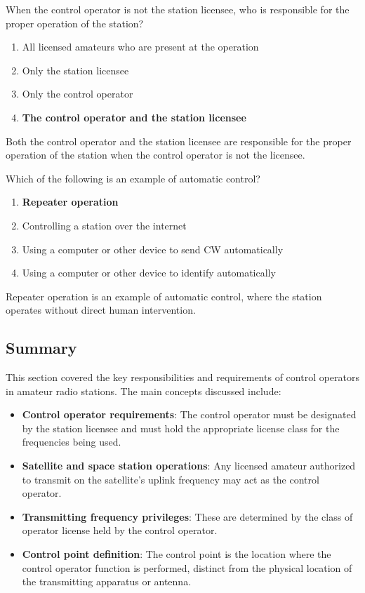
\begin{tcolorbox}[colback=gray!10!white,colframe=black!75!black,title={T1E07}]
When the control operator is not the station licensee, who is responsible for the proper operation of the station?
\begin{enumerate}[label=\Alph*,noitemsep]
    \item All licensed amateurs who are present at the operation
    \item Only the station licensee
    \item Only the control operator
    \item \textbf{The control operator and the station licensee}
\end{enumerate}
\end{tcolorbox}
Both the control operator and the station licensee are responsible for the proper operation of the station when the control operator is not the licensee.


\begin{tcolorbox}[colback=gray!10!white,colframe=black!75!black,title={T1E08}]
Which of the following is an example of automatic control?
\begin{enumerate}[label=\Alph*,noitemsep]
    \item \textbf{Repeater operation}
    \item Controlling a station over the internet
    \item Using a computer or other device to send CW automatically
    \item Using a computer or other device to identify automatically
\end{enumerate}
\end{tcolorbox}
Repeater operation is an example of automatic control, where the station operates without direct human intervention.


\subsection*{Summary}
This section covered the key responsibilities and requirements of control operators in amateur radio stations. The main concepts discussed include:
\begin{itemize}
    \item \textbf{Control operator requirements}: The control operator must be designated by the station licensee and must hold the appropriate license class for the frequencies being used.
    \item \textbf{Satellite and space station operations}: Any licensed amateur authorized to transmit on the satellite's uplink frequency may act as the control operator.
    \item \textbf{Transmitting frequency privileges}: These are determined by the class of operator license held by the control operator.
    \item \textbf{Control point definition}: The control point is the location where the control operator function is performed, distinct from the physical location of the transmitting apparatus or antenna.
\end{itemize}
